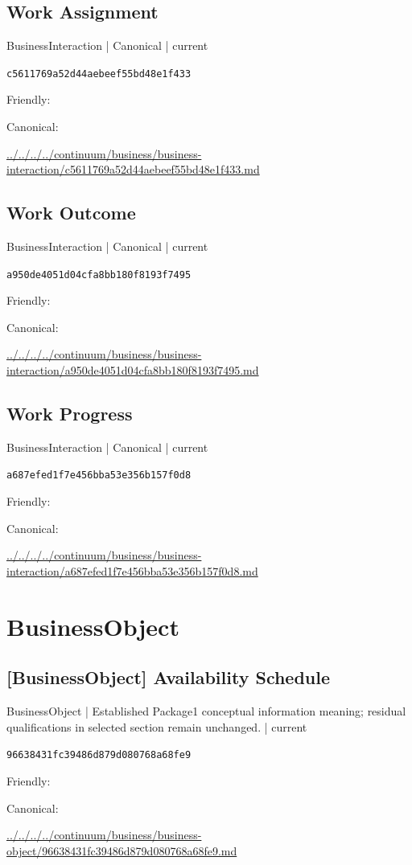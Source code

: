 \documentclass[10pt,a4paper]{article}
\begin{document}
\subsection*{Work Assignment}
{\small BusinessInteraction | Canonical | current}\par
\texttt{c5611769a52d44aebeef55bd48e1f433}\par
Friendly: \par
Canonical: \par
{\footnotesize\url{../../../../continuum/business/business-interaction/c5611769a52d44aebeef55bd48e1f433.md}}\par
\subsection*{Work Outcome}
{\small BusinessInteraction | Canonical | current}\par
\texttt{a950de4051d04cfa8bb180f8193f7495}\par
Friendly: \par
Canonical: \par
{\footnotesize\url{../../../../continuum/business/business-interaction/a950de4051d04cfa8bb180f8193f7495.md}}\par
\subsection*{Work Progress}
{\small BusinessInteraction | Canonical | current}\par
\texttt{a687efed1f7e456bba53e356b157f0d8}\par
Friendly: \par
Canonical: \par
{\footnotesize\url{../../../../continuum/business/business-interaction/a687efed1f7e456bba53e356b157f0d8.md}}\par
\section*{BusinessObject}
\subsection*{[BusinessObject] Availability Schedule}
{\small BusinessObject | Established Package1 conceptual information meaning; residual qualifications in selected section remain unchanged. | current}\par
\texttt{96638431fc39486d879d080768a68fe9}\par
Friendly: \par
Canonical: \par
{\footnotesize\url{../../../../continuum/business/business-object/96638431fc39486d879d080768a68fe9.md}}\par
\end{document}
